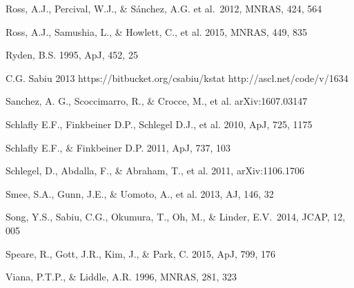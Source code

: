 \documentclass[prl,twocolumn,superscriptaddress,aps,amsmath,amssymb,nofootinbib,altaffilletter]{revtex4}
\begin{document}
\begin{thebibliography}{}
Ross, A.J., Percival, W.J., \& S{\'a}nchez, A.G. et al.\ 2012, MNRAS, 424, 564 

Ross, A.J., Samushia, L., \& Howlett, C., et al. 2015, MNRAS, 449, 835

Ryden, B.S. 1995, ApJ, 452, 25  




C.G. Sabiu 2013
https://bitbucket.org/csabiu/kstat
http://ascl.net/code/v/1634

Sanchez, A. G., Scoccimarro, R., \& Crocce, M., et al.
arXiv:1607.03147

Schlafly E.F., Finkbeiner D.P., Schlegel D.J., et al. 2010, ApJ, 725, 1175

Schlafly E.F., \& Finkbeiner D.P. 2011, ApJ, 737, 103


Schlegel, D., Abdalla, F., \& Abraham, T., et al. 2011, arXiv:1106.1706

Smee, S.A., Gunn, J.E., \& Uomoto, A., et al. 2013, AJ, 146, 32

Song, Y.S., Sabiu, C.G., 
Okumura, T., Oh, M., \& Linder, E.V.\ 2014, JCAP, 12, 005 

Speare, R., Gott, J.R., Kim, J., \& Park, C.
2015, ApJ, 799, 176



Viana, P.T.P., \& Liddle, A.R. 1996, MNRAS, 281, 323


\end{thebibliography}
\end{document}

